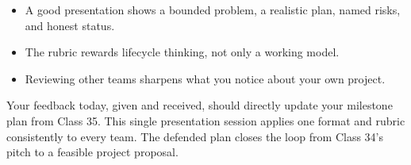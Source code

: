 \classclosingframe
{\begin{itemize}
\item A good presentation shows a bounded problem, a realistic plan, named risks, and honest status.
\item The rubric rewards lifecycle thinking, not only a working model.
\item Reviewing other teams sharpens what you notice about your own project.
\end{itemize}}
{Your feedback today, given and received, should directly update your milestone plan from Class 35.}
{This single presentation session applies one format and rubric consistently to every team.}
{The defended plan closes the loop from Class 34's pitch to a feasible project proposal.}


